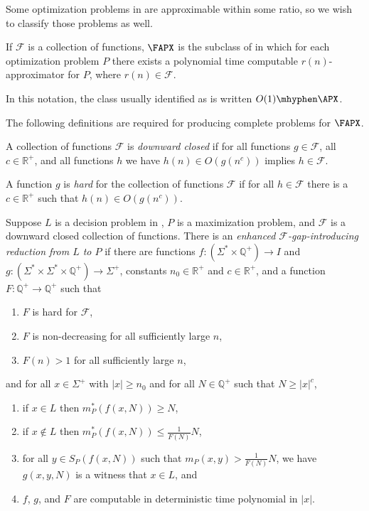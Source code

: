 \documentclass{article}
\begin{document}
Some optimization problems in \NPO{} are approximable within some ratio, so we wish to classify those problems as well.

\begin{definition}
  If $\mathcal{F}$ is a collection of functions, $\FAPX$ is the subclass of \NPO{} in which for each optimization problem $P$ there exists a polynomial time computable $r(n)$-approximator for $P$, where $r(n) \in \mathcal{F}$.
\end{definition}

In this notation, the class usually identified as \APX{} is written $O(1)\mhyphen\APX$.

The following definitions are required for producing complete problems for $\FAPX$.

\begin{definition}\label{def:downwardclosed}
  A collection of functions $\mathcal{F}$ is \emph{downward closed} if for all functions $g \in \mathcal{F}$, all $c \in \mathbb{R}^+$, and all functions $h$ we have $h(n) \in O(g(n^c))$ implies $h \in \mathcal{F}$.
\end{definition}

\begin{definition}\label{def:hardfunction}
  A function $g$ is \emph{hard} for the collection of functions $\mathcal{F}$ if for all $h \in \mathcal{F}$ there is a $c \in \mathbb{R}^+$ such that $h(n) \in O(g(n^c))$.
\end{definition}

\begin{definition}\label{def:gapintroducing}
  Suppose $L$ is a decision problem in \NP, $P$ is a maximization problem, and $\mathcal{F}$ is a downward closed collection of functions.
  There is an \emph{enhanced $\mathcal{F}$-gap-introducing reduction from $L$ to $P$} if there are functions $f \colon \left(\Sigma^* \times \mathbb{Q}^+ \right) \to I$ and $g \colon \left( \Sigma^* \times \Sigma^* \times \mathbb{Q}^+\right) \to \Sigma^+$, constants $n_0 \in \mathbb{R}^+$ and $c \in \mathbb{R}^+$, and a function $F \colon \mathbb{Q}^+ \to \mathbb{Q}^+$ such that
  \begin{enumerate}
  \item $F$ is hard for $\mathcal{F}$,
  \item $F$ is non-decreasing for all sufficiently large $n$,
  \item $F(n) > 1$ for all sufficiently large $n$,
  \end{enumerate}
  and for all $x \in \Sigma^+$ with $|x| \geq n_0$ and for all $N \in \mathbb{Q}^+$ such that $N \geq |x|^c$,
  \begin{enumerate}
  \item if $x \in L$ then $m_P^*(f(x, N)) \geq N$,
  \item if $x \notin L$ then $m_P^*(f(x, N)) \leq \frac{1}{F(N)} N$,
  \item for all $y \in S_P(f(x, N))$ such that $m_P(x, y) > \frac{1}{F(N)} N$, we have $g(x, y, N)$ is a witness that $x \in L$, and
  \item $f$, $g$, and $F$ are computable in deterministic time polynomial in $|x|$.
  \end{enumerate}
\end{definition}
\end{document}
